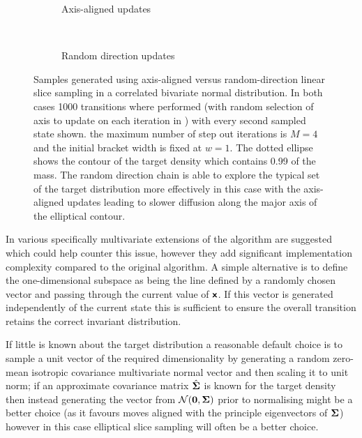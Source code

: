 \begin{figure}
\centering
\begin{subfigure}[b]{.46\linewidth}
\centering
  
  \vspace{-6mm}
  \caption{Axis-aligned updates}
  \label{sfig:axis-aligned-linear-slice-sampler}
\end{subfigure}
~~
\begin{subfigure}[b]{.46\linewidth}
\centering
  
  \vspace{-6mm}
  \caption{Random direction updates}
  \label{sfig:random-direction-linear-slice-sampler}
\end{subfigure}
  \caption[Linear slice sampler comparison.]{Samples generated using  axis-aligned versus  random-direction  linear slice sampling in a correlated bivariate normal distribution. In both cases 1000 transitions where performed (with random selection of axis to update on each iteration in ) with every second sampled state shown.  the maximum number of step out iterations is $M=4$ and the initial bracket width is fixed at $w=1$. The dotted ellipse shows the contour of the target density which contains 0.99 of the mass. The random direction chain is able to explore the typical set of the target distribution more effectively in this case with the axis-aligned updates leading to slower diffusion along the major axis of the elliptical contour.}
  \label{fig:linear-slice-sampler-comparison}
\end{figure}

In \citep{neal2003slice} various specifically multivariate extensions of the algorithm are suggested which could help counter this issue, however they add significant implementation complexity compared to the original algorithm. A simple alternative is to define the one-dimensional subspace as being the line defined by a randomly chosen vector and passing through the current value of $\boldsymbol{\mathsf{x}}$. If this vector is generated independently of the current state this is sufficient to ensure the overall transition retains the correct invariant distribution. 

If little is known about the target distribution a reasonable default choice is to sample a unit vector of the required dimensionality by generating a random zero-mean isotropic covariance multivariate normal vector and then scaling it to unit norm; if an approximate covariance matrix $\hat{\boldsymbol{\Sigma}}$ is known for the target density then instead generating the vector from $\nrm{\vct{0},\mtx{\Sigma}}$ prior to normalising might be a better choice (as it favours moves aligned with the principle eigenvectors of $\boldsymbol{\Sigma}$) however in this case elliptical slice sampling will often be a better choice. 

